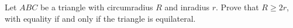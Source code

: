 Let $ABC$ be a triangle with circumradius $R$ and inradius $r$. Prove that $R\ge2r$, with equality if and only if the triangle is equilateral.
